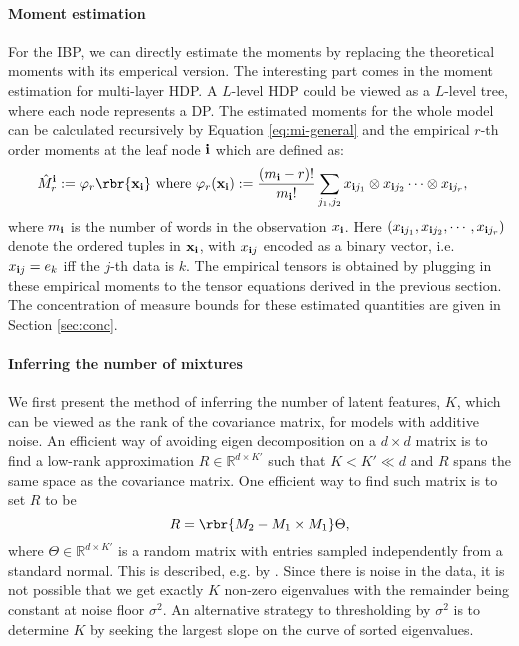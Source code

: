 \documentclass[twoside,11pt]{article}
\newcommand{\ib}{{\bf i}}
\begin{document}
{\paragraph{Moment estimation} 
For the IBP, we can directly estimate the moments by replacing the theoretical moments  with its emperical version. The interesting part comes in the moment estimation for multi-layer HDP.
A $L$-level HDP could be viewed as a $L$-level tree, where each node
represents a DP.  The estimated moments for the whole model can
be calculated recursively by Equation \eqref{eq:mi-general} and the empirical
$r$-th order moments at the leaf node $\ib$ which are defined as:
\begin{align*}
  \hat{M}_r^{\ib} & := \varphi_r\rbr{\mathbf{x}_{\ib} } \text{ where } 
  \varphi_r(\mathbf{x}_{\ib}) := \frac{(m_\ib-r) !}{m_\ib !}\sum \limits_{j_1,j_2}x_{\ib j_1} \otimes x_{\ib j_2} \cdots  \otimes x_{\ib j_r},
\end{align*}
where $m_\ib$ is the number of words in the observation $x_{\ib}$.
Here $(x_{\ib j_1}, x_{\ib j_2}, \cdots, x_{\ib j_r})$ denote the ordered tuples in
$\mathbf{x_{\ib}}$, with $x_{\ib j}$ encoded as a binary vector, i.e.\ $x_{\ib j}= e_k$
iff the $j$-th data is $k$. The empirical tensors is obtained by plugging in these empirical 
moments to the tensor equations derived in the previous section.
The concentration of measure bounds for these estimated
quantities are given in Section \ref{sec:conc}.

\paragraph{Inferring the number of mixtures} 
We first present the method of inferring the number of
latent features, $K$, which can be viewed as the rank of the covariance
matrix, for models with additive noise. 
An efficient way of avoiding eigen decomposition on a $d \times
d$ matrix is to find a low-rank approximation $R \in \mathbb{R}^{d \times K'}$ 
such that $K < K' \ll d$ and $R$ spans the same space as the covariance
matrix. One efficient way to find such matrix is to set $R$ to be
\begin{equation}
   R = \rbr{M_2 - M_1 \times M_1}\Theta,
\end{equation}
where $\Theta \in \mathbb{R}^{d \times K'}$ is a random matrix with
entries sampled independently from a standard normal. This is
described, e.g. by \cite{HalMarTro09}. Since there is noise in the
data, it is not possible that we get exactly $K$ non-zero eigenvalues
with the remainder being constant at noise floor $\sigma^2$. An
alternative strategy to thresholding by $\sigma^2$ is to determine $K$
by seeking the largest slope on the curve of sorted eigenvalues.

}
\end{document}
